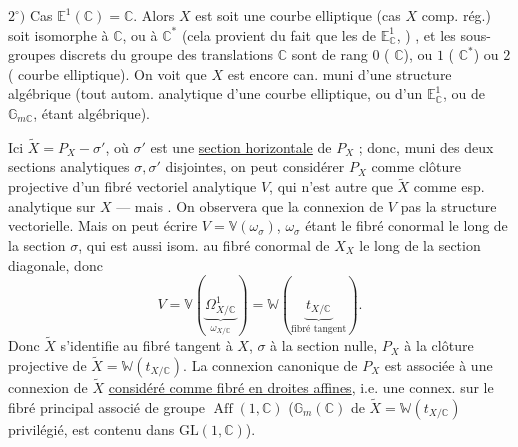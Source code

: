 $2^\circ)$ Cas $\mathbb E^1(\mathbb C)=\mathbb C$. Alors $X$ est soit  une courbe elliptique (cas $X$ comp. rég.) soit isomorphe à $\mathbb C$, ou à $\mathbb C^*$ (cela provient du fait que les  de  $\mathbb E^1_{\mathbb C}$, )  , et les sous-groupes discrets  du groupe des translations $\mathbb C$ sont de rang $0$ ( $\mathbb C$), ou $1$ ( $\mathbb C^*$) ou $2$ ( courbe elliptique). On voit que $X$ est encore can. muni d'une structure algébrique (tout autom. analytique d'une courbe elliptique, ou d'un $\mathbb E^1_{\mathbb C}$, ou de $\mathbb G_{m\mathbb C}$, étant algébrique).


Ici $\widetilde X=P_X-\sigma'$, où $\sigma'$ est une \uline{section horizontale} de $P_X$ ; donc,  muni des deux sections analytiques $\sigma,\sigma'$ disjointes, on peut considérer $P_X$ comme clôture projective d'un fibré vectoriel analytique $V$, qui n'est autre que $\widetilde X$ comme esp. analytique sur $X$ --- mais . On observera que la connexion de $V$   pas la structure vectorielle. Mais on peut
écrire $V=\mathbb V(\omega_\sigma)$, $\omega_\sigma$ étant le fibré conormal le long de la section $\sigma$, qui est aussi isom. au fibré conormal de $X_X$ le long de la section diagonale, donc
\[
V=\mathbb V(\underbrace{\Omega^1_{X/\mathbb C}}_{\omega_{X/\mathbb C}})=\mathbb W(\underbrace{t_{X/\mathbb C}}_{\text{fibré tangent}}).
\]
Donc $\widetilde X$ s'identifie au fibré tangent à $X$, $\sigma$ à la section nulle, $P_X$ à la clôture projective de $\widetilde X=\mathbb W(t_{X/\mathbb C})$. La connexion  canonique de $P_X$ est associée à une connexion de $\widetilde X$ \uline{considéré comme fibré en droites affines}, i.e. une connex. sur le fibré principal associé de groupe $\operatorname{Aff}(1,\mathbb C)$ ($\mathbb G_m(\mathbb C)$ de $\widetilde X=\mathbb W(t_{X/\mathbb C})$ privilégié, est contenu dans $\mathrm{GL}(1,\mathbb C)$).

